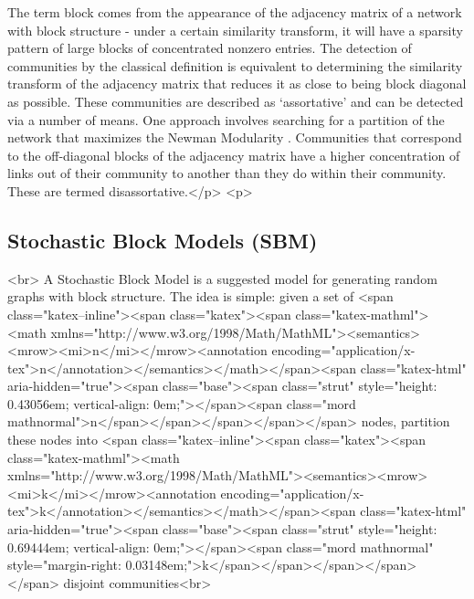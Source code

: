 The term block comes from the appearance of the adjacency matrix of a network with block structure - under a certain similarity transform, it will have a sparsity pattern of large blocks of concentrated nonzero entries. The detection of communities by the classical definition is equivalent to determining the similarity transform of the adjacency matrix that reduces it as close to being block diagonal as possible. These communities are described as ‘assortative’ and can be detected via a number of means. One approach involves searching for a partition of the network that maximizes the Newman Modularity \cite{newman_2006}. Communities that correspond to the off-diagonal blocks of the adjacency matrix  have a higher concentration of links out of their community to another than they do within their community. These are termed disassortative.</p>
<p>\subsection{Stochastic Block Models (SBM)}<br>
A Stochastic Block Model is a suggested model for generating random graphs with block structure. The idea is simple: given a set of <span class="katex--inline"><span class="katex"><span class="katex-mathml"><math xmlns="http://www.w3.org/1998/Math/MathML"><semantics><mrow><mi>n</mi></mrow><annotation encoding="application/x-tex">n</annotation></semantics></math></span><span class="katex-html" aria-hidden="true"><span class="base"><span class="strut" style="height: 0.43056em; vertical-align: 0em;"></span><span class="mord mathnormal">n</span></span></span></span></span> nodes, partition these nodes into <span class="katex--inline"><span class="katex"><span class="katex-mathml"><math xmlns="http://www.w3.org/1998/Math/MathML"><semantics><mrow><mi>k</mi></mrow><annotation encoding="application/x-tex">k</annotation></semantics></math></span><span class="katex-html" aria-hidden="true"><span class="base"><span class="strut" style="height: 0.69444em; vertical-align: 0em;"></span><span class="mord mathnormal" style="margin-right: 0.03148em;">k</span></span></span></span></span> disjoint communities<br>
